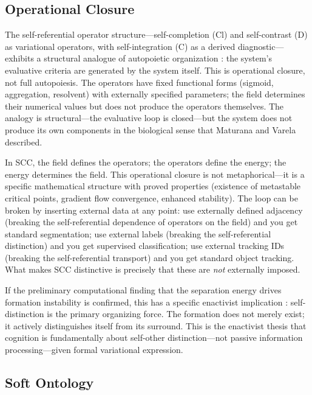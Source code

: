 \documentclass[lettersize,journal]{IEEEtran}
\begin{document}
\subsection{Operational Closure}

The self-referential operator structure---self-completion (Cl) and self-contrast (D) as variational operators, with self-integration (C) as a derived diagnostic---exhibits a structural analogue of autopoietic organization \cite{maturana1980autopoiesis}: the system's evaluative criteria are generated by the system itself. This is operational closure, not full autopoiesis. The operators have fixed functional forms (sigmoid, aggregation, resolvent) with externally specified parameters; the field determines their numerical values but does not produce the operators themselves. The analogy is structural---the evaluative loop is closed---but the system does not produce its own components in the biological sense that Maturana and Varela described.

In SCC, the field defines the operators; the operators define the energy; the energy determines the field. This operational closure is not metaphorical---it is a specific mathematical structure with proved properties (existence of metastable critical points, gradient flow convergence, enhanced stability). The loop can be broken by inserting external data at any point: use externally defined adjacency (breaking the self-referential dependence of operators on the field) and you get standard segmentation; use external labels (breaking the self-referential distinction) and you get supervised classification; use external tracking IDs (breaking the self-referential transport) and you get standard object tracking. What makes SCC distinctive is precisely that these are \emph{not} externally imposed.

If the preliminary computational finding that the separation energy drives formation instability is confirmed, this has a specific enactivist implication \cite{thompson2007mind}: self-distinction is the primary organizing force. The formation does not merely exist; it actively distinguishes itself from its surround. This is the enactivist thesis that cognition is fundamentally about self-other distinction---not passive information processing---given formal variational expression.

\subsection{Soft Ontology}
\end{document}
